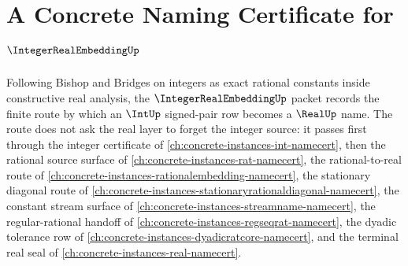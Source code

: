 \chapter{A Concrete Naming Certificate for $\IntegerRealEmbeddingUp$}
\label{ch:concrete-instances-integer-real-embedding-namecert}

Following Bishop and Bridges on integers as exact rational constants inside constructive real analysis, the $\IntegerRealEmbeddingUp$ packet records the finite route by which an $\IntUp$ signed-pair row becomes a $\RealUp$ name. The route does not ask the real layer to forget the integer source: it passes first through the integer certificate of \autoref{ch:concrete-instances-int-namecert}, then the rational source surface of \autoref{ch:concrete-instances-rat-namecert}, the rational-to-real route of \autoref{ch:concrete-instances-rationalembedding-namecert}, the stationary diagonal route of \autoref{ch:concrete-instances-stationaryrationaldiagonal-namecert}, the constant stream surface of \autoref{ch:concrete-instances-streamname-namecert}, the regular-rational handoff of \autoref{ch:concrete-instances-regseqrat-namecert}, the dyadic tolerance row of \autoref{ch:concrete-instances-dyadicratcore-namecert}, and the terminal real seal of \autoref{ch:concrete-instances-real-namecert}.

